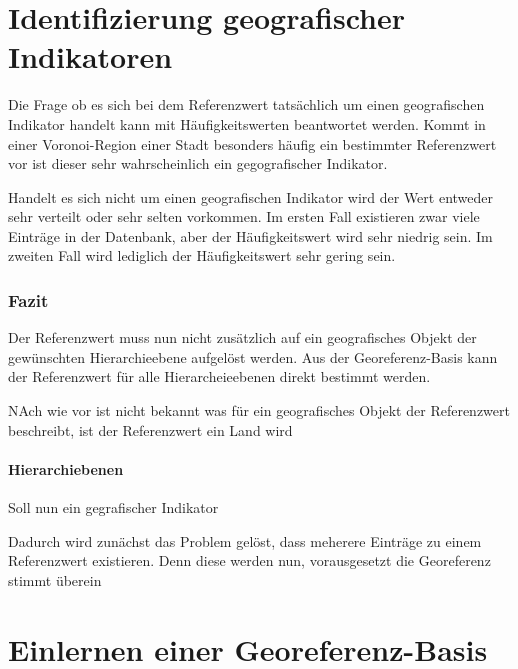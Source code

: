 		\section{Identifizierung geografischer Indikatoren}

			Die Frage ob es sich bei dem Referenzwert tatsächlich um einen geografischen Indikator handelt kann mit Häufigkeitswerten beantwortet werden.
			Kommt in einer Voronoi-Region einer Stadt besonders häufig ein bestimmter Referenzwert vor ist dieser sehr wahrscheinlich ein gegografischer Indikator.

			Handelt es sich nicht um einen geografischen Indikator wird der Wert entweder sehr verteilt oder sehr selten vorkommen.
			Im ersten Fall existieren zwar viele Einträge in der Datenbank, aber der Häufigkeitswert wird sehr niedrig sein.
			Im zweiten Fall wird lediglich der Häufigkeitswert sehr gering sein.




		
				
			\subsubsection{Fazit} 

				Der Referenzwert muss nun nicht zusätzlich auf ein geografisches Objekt der gewünschten Hierarchieebene aufgelöst werden.
				Aus der Georeferenz-Basis kann der Referenzwert für alle Hierarcheieebenen direkt bestimmt werden.

				NAch wie vor ist nicht bekannt was für ein geografisches Objekt der Referenzwert beschreibt, ist der Referenzwert ein Land wird 



		
			\paragraph{Hierarchiebenen}   


			Soll nun ein gegrafischer Indikator



			Dadurch wird zunächst das Problem gelöst, dass meherere Einträge zu einem Referenzwert existieren.
			Denn diese werden nun, vorausgesetzt die Georeferenz stimmt überein 






			





	\section{Einlernen einer Georeferenz-Basis}

